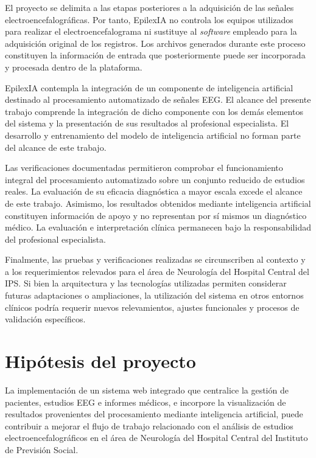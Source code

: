 El proyecto se delimita a las etapas posteriores a la adquisición de las
señales electroencefalográficas. Por tanto, EpilexIA no controla los equipos
utilizados para realizar el electroencefalograma ni sustituye al \textit{software}
empleado para la adquisición original de los registros. Los archivos
generados durante este proceso constituyen la información de entrada que
posteriormente puede ser incorporada y procesada dentro de la plataforma.

EpilexIA contempla la integración de un componente de inteligencia
artificial destinado al procesamiento automatizado de señales EEG.
El alcance del presente trabajo comprende la integración de dicho
componente con los demás elementos del sistema y la presentación de
sus resultados al profesional especialista. El desarrollo y
entrenamiento del modelo de inteligencia artificial no forman parte
del alcance de este trabajo.

Las verificaciones documentadas permitieron comprobar el funcionamiento integral del procesamiento automatizado sobre un conjunto reducido de estudios reales.
La evaluación de su eficacia diagnóstica a mayor escala excede el alcance de este trabajo. Asimismo, los
resultados obtenidos mediante inteligencia artificial constituyen
información de apoyo y no representan por sí mismos un diagnóstico
médico. La evaluación e interpretación clínica permanecen bajo la
responsabilidad del profesional especialista.

Finalmente, las pruebas y verificaciones realizadas se circunscriben al contexto y a los requerimientos relevados para el área de Neurología del Hospital Central del IPS. Si bien la arquitectura y las tecnologías utilizadas permiten considerar futuras adaptaciones o ampliaciones, la utilización del sistema en otros entornos clínicos podría requerir nuevos relevamientos, ajustes funcionales
y procesos de validación específicos.

\section{Hipótesis del proyecto}
\label{sec:hipotesis}

La implementación de un sistema web integrado que centralice la gestión de
pacientes, estudios EEG e informes médicos, e incorpore la visualización de
resultados provenientes del procesamiento mediante inteligencia artificial,
puede contribuir a mejorar el flujo de trabajo relacionado con el análisis
de estudios electroencefalográficos en el área de Neurología del Hospital
Central del Instituto de Previsión Social.

